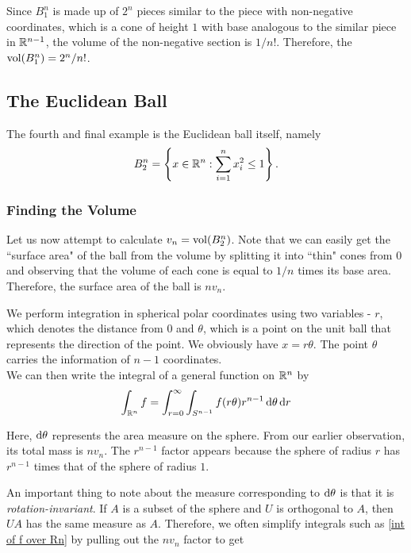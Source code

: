 Since $B_1^n$ is made up of $2^n$ pieces similar to the piece with non-negative coordinates, which is a cone of height $1$ with base analogous to the similar piece in $\mathbb{R}^{n-1}$, the volume of the non-negative section is $1/n!$. Therefore, the $\operatorname{vol}(B_1^n) = 2^n / n!$. \\

\subsection{The Euclidean Ball}
\label{section: The Euclidean Ball}

The fourth and final example is the Euclidean ball itself, namely
$$B_2^n = \left\{x\in \mathbb{R}^n: \sum_{i=1}^n x_i^2 \leq 1\right\}.$$

\subsubsection{Finding the Volume}

Let us now attempt to calculate $v_n = \operatorname{vol}(B_2^n)$. Note that we can easily get the ``surface area" of the ball from the volume by splitting it into ``thin" cones from $0$ and observing that the volume of each cone is equal to $1/n$ times its base area. Therefore, the surface area of the ball is $nv_n$. 

We perform integration in spherical polar coordinates using two variables - $r$, which denotes the distance from $0$ and $\theta$, which is a point on the unit ball that represents the direction of the point. We obviously have $x=r\theta$. The point $\theta$ carries the information of $n-1$ coordinates.\\
We can then write the integral of a general function on $\mathbb{R}^n$ by
\begin{equation}
\label{int of f over Rn}
    \int_{\mathbb{R}^n} f = \int_{r=0}^\infty \int_{S^{n-1}} f(r\theta) r^{n-1} \operatorname{d}\!{\theta} \operatorname{d}\!{r}
\end{equation}

Here, $\operatorname{d}\!{\theta}$ represents the area measure on the sphere. From our earlier observation, its total mass is $nv_n$. The $r^{n-1}$ factor appears because the sphere of radius $r$ has $r^{n-1}$ times that of the sphere of radius $1$.

An important thing to note about the measure corresponding to $\operatorname{d}\!{\theta}$ is that it is \textit{rotation-invariant}. If $A$ is a subset of the sphere and $U$ is orthogonal to $A$, then $UA$ has the same measure as $A$. Therefore, we often simplify integrals such as \ref{int of f over Rn} by pulling out the $nv_n$ factor to get

